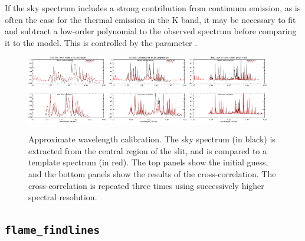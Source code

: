 \documentclass[a4paper]{article}
\begin{document}
\begin{sloppypar}
If the sky spectrum includes a strong contribution from continuum emission, as is often the case for the thermal emission in the K band, it may be necessary to fit and subtract a low-order polynomial to the observed spectrum before comparing it to the model. This is controlled by the parameter .


\begin{figure}[tbp]
\begin{minipage}{\textwidth}
   \centering
 \includegraphics[width=0.31\textwidth]{wavecal1}
   \hspace*{0.01\textwidth}
 \includegraphics[width=0.31\textwidth]{wavecal2}
  \hspace*{0.01\textwidth}
 \includegraphics[width=0.31\textwidth]{wavecal3}
\end{minipage}
\caption{Approximate wavelength calibration. The sky spectrum (in black) is extracted from the central region of the slit, and is compared to a template spectrum (in red). The top panels show the initial guess, and the bottom panels show the results of the cross-correlation. The cross-correlation is repeated three times using successively higher spectral resolution.}
\label{fig:wavecal_approx}
\end{figure}


\subsection{\texttt{flame\_findlines}}



\end{sloppypar}
\end{document}
